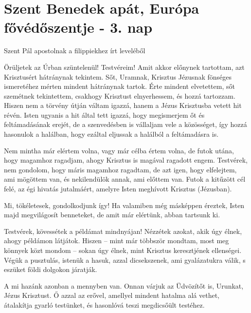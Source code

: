 \documentclass[twoside]{article}
\begin{document}

\section*{Szent Benedek apát, Európa fővédőszentje - 3. nap}

Szent Pál apostolnak a filippiekhez írt leveléből

\begin{lectio}{Örüljetek az Úrban szüntelenül!}
\noindent Testvéreim! Amit akkor előnynek tartottam, azt Krisztusért hátránynak tekintem. Sőt, Uramnak, Krisztus Jézusnak fönséges ismeretéhez mérten mindent hátránynak tartok. Érte mindent elvetettem, sőt szemétnek tekintettem, csakhogy Krisztust elnyerhessem, és hozzá tartozzam. Hiszen nem a törvény útján váltam igazzá, hanem a Jézus Krisztusba vetett hit révén. Isten ugyanis a hit által tett igazzá, hogy megismerjem őt és feltámadásának erejét, de a szenvedésben is vállaljam vele a közösséget, így hozzá hasonulok a halálban, hogy ezáltal eljussak a halálból a feltámadásra is.

Nem mintha már elértem volna, vagy már célba értem volna, de futok utána, hogy magamhoz ragadjam, ahogy Krisztus is magával ragadott engem. Testvérek, nem gondolom, hogy máris magamhoz ragadtam, de azt igen, hogy elfelejtem, ami mögöttem van, és nekilendülök annak, ami előttem van. Futok a kitűzött cél felé, az égi hivatás jutalmáért, amelyre Isten meghívott Krisztus (Jézusban).

Mi, tökéletesek, gondolkodjunk így! Ha valamiben még másképpen éreztek, Isten majd megvilágosít benneteket, de amit már elértünk, abban tartsunk ki.

Testvérek, kövessétek a példámat mindnyájan! Nézzétek azokat, akik úgy élnek, ahogy példámon látjátok. Hiszen – mint már többször mondtam, most meg könnyek közt mondom – sokan úgy élnek, mint Krisztus keresztjének ellenségei. Végük a pusztulás, istenük a hasuk, azzal dicsekszenek, ami gyalázatukra válik, s eszüket földi dolgokon járatják.

A mi hazánk azonban a mennyben van. Onnan várjuk az Üdvözítőt is, Urunkat, Jézus Krisztust. Ő azzal az erővel, amellyel mindent hatalma alá vethet, átalakítja gyarló testünket, és hasonlóvá teszi megdicsőült testéhez.


\end{lectio}
\end{document}
